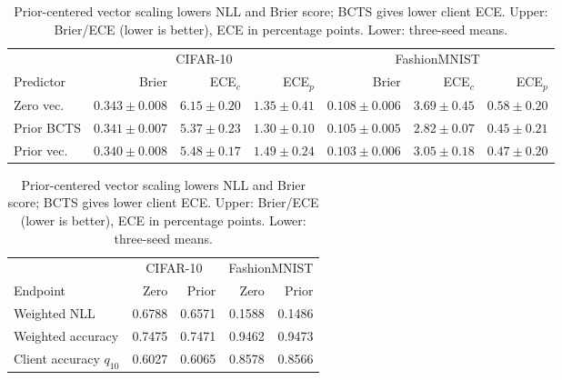 \begin{table}[!htb]\centering\small\setlength{\tabcolsep}{1pt}
\caption{Prior-centered vector scaling lowers NLL and Brier score; BCTS gives lower client ECE. Upper: Brier/ECE (lower is better), ECE in percentage points. Lower: three-seed means.}\label{tab:quality}
\begin{tabular}{@{}lrrrrrr@{}}\toprule
& \multicolumn{3}{c}{CIFAR-10} & \multicolumn{3}{c}{FashionMNIST}\\
Predictor & Brier & ECE$_c$ & ECE$_p$ & Brier & ECE$_c$ & ECE$_p$\\\midrule
Zero vec. & $0.343\pm0.008$ & $6.15\pm0.20$ & $1.35\pm0.41$ & $0.108\pm0.006$ & $3.69\pm0.45$ & $0.58\pm0.20$\\
Prior BCTS & $0.341\pm0.007$ & $5.37\pm0.23$ & $1.30\pm0.10$ & $0.105\pm0.005$ & $2.82\pm0.07$ & $0.45\pm0.21$\\
Prior vec. & $0.340\pm0.008$ & $5.48\pm0.17$ & $1.49\pm0.24$ & $0.103\pm0.006$ & $3.05\pm0.18$ & $0.47\pm0.20$\\\bottomrule
\end{tabular}
\par\medskip
\begin{tabular}{lrrrr}\toprule
& \multicolumn{2}{c}{CIFAR-10} & \multicolumn{2}{c}{FashionMNIST}\\
Endpoint & Zero & Prior & Zero & Prior\\\midrule
Weighted NLL & 0.6788 & 0.6571 & 0.1588 & 0.1486\\
Weighted accuracy & 0.7475 & 0.7471 & 0.9462 & 0.9473\\
Client accuracy $q_{10}$ & 0.6027 & 0.6065 & 0.8578 & 0.8566\\\bottomrule
\end{tabular}
\end{table}
